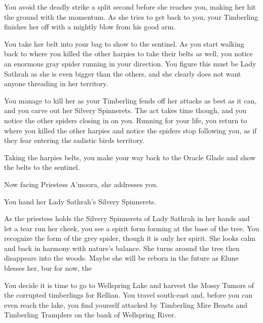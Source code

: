 
You avoid the deadly strike a split second before she reaches you, making her hit the ground with the momentum. As she tries to get back to you, your Timberling finishes her off with a mightly blow from his good arm.

You take her belt into your bag to show to the sentinel. As you start walking back to where you killed the other harpies to take their belts as well, you notice an enormous gray spider running in your direction. You figure this must be Lady Sathrah as she is even bigger than the others, and she clearly does not want anyone threading in her territory.

You manage to kill her as your Timberling fends off her attacks as best as it can, and you carve out her Silvery Spinnerets. The act takes time though, and you notice the other spiders closing in on you. Running for your life, you return to where you killed the other harpies and notice the spiders stop following you, as if they fear entering the sadistic birds territory.

Taking the harpies belts, you make your way back to the Oracle Glade and show the belts to the sentinel.


Now facing Priestess A'moora, she addresses you.


You hand her Lady Sathrah's Silvery Spinnerets.


As the priestess holds the Silvery Spinnerets of Lady Sathrah in her hands and let a tear run her cheek, you see a spirit form forming at the base of the tree. You recognize the form of the grey spider, though it is only her spirit. She looks calm and back in harmony with nature's balance. She turns around the tree then disappears into the woods. Maybe she will be reborn in the future as Elune blesses her, bur for now, the 

You decide it is time to go to Wellspring Lake and harvest the Mossy Tumors of the corrupted timberlings for Rellian. You travel south-east and, before you can even reach the lake, you find yourself attacked by Timberling Mire Beasts and Timberling Tramplers on the bank of Wellspring River.

